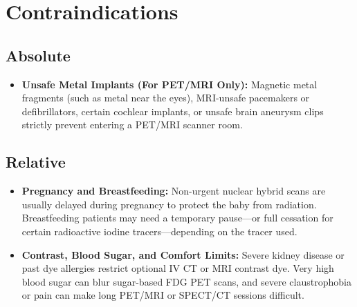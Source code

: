 \section{Contraindications}

\subsection{Absolute}
\begin{itemize}
    \item \textbf{Unsafe Metal Implants (For PET/MRI Only):} Magnetic metal fragments (such as metal near the eyes), MRI-unsafe pacemakers or defibrillators, certain cochlear implants, or unsafe brain aneurysm clips strictly prevent entering a PET/MRI scanner room.
\end{itemize}

\subsection{Relative}
\begin{itemize}
    \item \textbf{Pregnancy and Breastfeeding:} Non-urgent nuclear hybrid scans are usually delayed during pregnancy to protect the baby from radiation. Breastfeeding patients may need a temporary pause---or full cessation for certain radioactive iodine tracers---depending on the tracer used.
    \item \textbf{Contrast, Blood Sugar, and Comfort Limits:} Severe kidney disease or past dye allergies restrict optional IV CT or MRI contrast dye. Very high blood sugar can blur sugar-based FDG PET scans, and severe claustrophobia or pain can make long PET/MRI or SPECT/CT sessions difficult.
\end{itemize}


